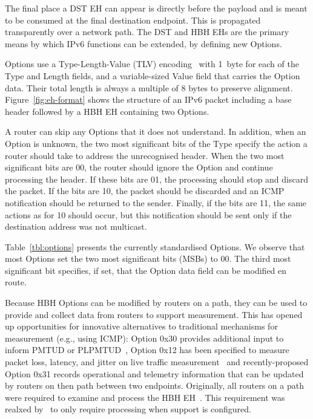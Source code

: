 \documentclass[conference]{IEEEtran}
\begin{document}
The final place a DST EH can appear is directly before the payload and is meant to be consumed at the final destination endpoint. This is propagated transparently over a network path. The DST and HBH EHs are the primary means by which IPv6 functions can be extended, by defining new Options.


Options use a Type-Length-Value (TLV) encoding~\cite{RFC8200} with 1~byte for each of the Type and Length fields, and a variable-sized Value field that carries the Option data. Their total length is always a multiple of 8 bytes to preserve alignment. Figure~\ref{fig:eh-format} shows the structure of an IPv6 packet including a base header followed by a HBH EH containing two Options.


A router can skip any Options that it does not understand. In addition, when an Option is unknown, the two most significant bits of the Type
specify the action a router should take to address the unrecognised header. When the two most significant bits are 00, the router should
ignore the Option and continue processing the header. If these bits are 01, the
processing should stop and discard the packet. If the bits are 10,
the packet should be discarded and an ICMP notification should be returned to
the sender. Finally, if the bits are 11, the same actions as for 10 should occur,
but this notification should be sent only if the destination address was not multicast. 

Table~\ref{tbl:options} presents the currently standardised 
Options.  We observe that most Options set the two most significant bits
(MSBs) to 00.  The third most significant bit specifies, if set, that the Option data field can be modified en route.

Because HBH Options can be modified by routers on a path, they can be used to provide and collect data from routers to support measurement. This has opened up opportunities for innovative alternatives to traditional mechanisms for measurement (e.g., using ICMP): Option 0x30 provides additional input to inform  PMTUD or PLPMTUD~\cite{rfc9268}, Option 0x12 has been specified to measure packet loss, latency, and jitter on live traffic measurement~\cite{rfc9343} and recently-proposed Option 0x31 records operational and telemetry information that can be updated by routers on then path between two endpoints.
Originally, all routers on a path were required to examine and process the HBH EH~\cite{rfc2460}. This requirement was realxed by~\cite{RFC8200} to only require processing when support is  configured.
\end{document}
